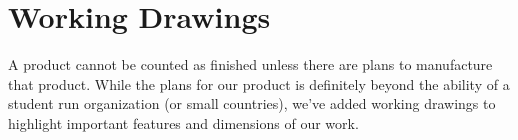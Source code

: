 
\section{Working Drawings}
A product cannot be counted as finished unless there are plans to manufacture that product. While the plans for our product is definitely beyond the ability of a student run organization (or small countries), 
we've added working drawings to highlight important features and dimensions of our work.

\newcommand{\WorkingDrawing}[1]{
 \subsection{#1}
 
 }
